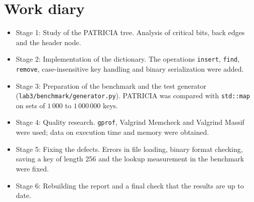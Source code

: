 \section{Work diary}

\begin{itemize}
    \item Stage 1: Study of the PATRICIA tree. Analysis of critical bits, back edges and the header
    node.
    \item Stage 2: Implementation of the dictionary. The operations \texttt{insert}, \texttt{find},
    \texttt{remove}, case-insensitive key handling and binary serialization were added.
    \item Stage 3: Preparation of the benchmark and the test generator
    (\texttt{lab3/benchmark/generator.py}). PATRICIA was compared with \texttt{std::map} on sets of
    $1\,000$ to $1\,000\,000$ keys.
    \item Stage 4: Quality research. \texttt{gprof}, Valgrind Memcheck and Valgrind Massif were
    used; data on execution time and memory were obtained.
    \item Stage 5: Fixing the defects. Errors in file loading, binary format checking, saving a key
    of length 256 and the lookup measurement in the benchmark were fixed.
    \item Stage 6: Rebuilding the report and a final check that the results are up to date.
\end{itemize}

\pagebreak
